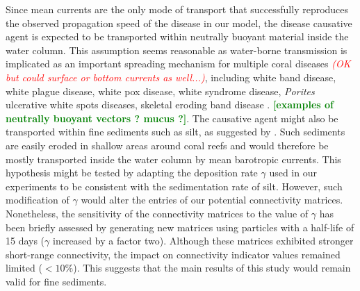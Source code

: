 \documentclass[utf8]{frontiersSCNS}
\newcommand{\emphc}[1]{\emph{\textcolor{red}{#1}}}
\newcommand{\erinn}[1]{\textbf{\textcolor{green}{#1}}}
\begin{document}
Since mean currents are the only mode of transport that successfully reproduces the observed propagation speed of the disease in our model, the disease causative agent is expected to be transported within neutrally buoyant material inside the water column. This assumption seems reasonable as water-borne transmission is implicated as an important spreading mechanism for multiple coral diseases \emphc{(OK but could surface or bottom currents as well...)}, including white band disease, white plague disease, white pox disease, white syndrome disease, \textit{Porites} ulcerative white spots diseases, skeletal eroding band disease \citep{shore2019modes}. \erinn{[examples of neutrally buoyant vectors ? mucus ?]}. The causative agent might also be transported within fine sediments such as silt, as suggested by \cite{rosales2020rhodobacterales}. Such sediments are easily eroded in shallow areas around coral reefs and would therefore be mostly transported inside the water column by mean barotropic currents. This hypothesis might be tested by adapting the deposition rate $\gamma$ used in our experiments to be consistent with the sedimentation rate of silt. However, such modification of $\gamma$ would alter the entries of our potential connectivity matrices. Nonetheless, the sensitivity of the connectivity matrices to the value of $\gamma$ has been briefly assessed by generating new matrices using particles with a half-life of 15 days ($\gamma$ increased by a factor two). Although these matrices exhibited stronger short-range connectivity, the impact on connectivity indicator values remained  limited ($<10\%$). This suggests that the main results of this study would remain valid for fine sediments.  

\end{document}
